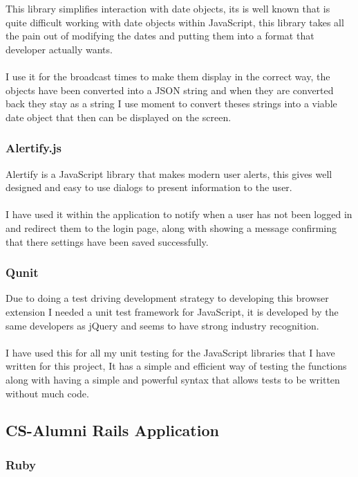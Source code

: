 \documentclass{article}
\begin{document}
This library simplifies interaction with date objects, its is well known that is quite difficult working with date objects within JavaScript, this library takes all the pain out of modifying the dates and putting them into a format that developer actually wants.\\
\\
I use it for the broadcast times to make them display in the correct way, the objects have been converted into a JSON string and when they are converted back they stay as a string I use moment to convert theses strings into a viable date object that then can be displayed on the screen.

\subsubsection{Alertify.js}

Alertify is a JavaScript library that makes modern user alerts, this gives well designed and easy to use dialogs to present information to the user.\\
\\ 
I have used it within the application to notify when a user has not been logged in and redirect them to the login page, along with showing a message confirming that there settings have been saved successfully.

\subsubsection{Qunit}

Due to doing a test driving development strategy to developing this browser extension I needed a unit test framework for JavaScript, it is developed by the same developers as jQuery and seems to have strong industry recognition.\\
\\
I have used this for all my unit testing for the JavaScript libraries that I have written for this project, It has a simple and efficient way of testing the functions along with having a simple and powerful syntax that allows tests to be written without much code.

\subsection{CS-Alumni Rails Application}

\subsubsection{Ruby}
\end{document}
